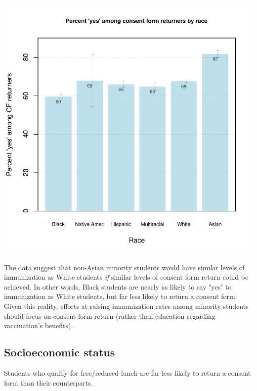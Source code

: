\begin{multicols}{2}
\begin{center}
\includegraphics{targeting-005}
\end{center}

The data suggest that non-Asian minority students would have similar levels of immunization as White students \emph{if} similar levels of consent form return could be achieved.  In other words, Black students are nearly as likely to say "yes" to immunization as White students, but far less likely to return a consent form.   Given this reality, efforts at raising immunization rates among minority students should focus on consent form return (rather than education regarding vaccination's benefits). 

\vfill
\columnbreak

\subsection*{Socioeconomic status}
Students who qualify for free/reduced lunch are far less likely to return a consent form than their counterparts.



\end{multicols}
